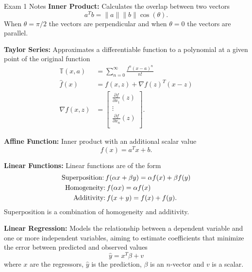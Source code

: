 \begin{examnotes}{Exam 1 Notes}
    \textbf{Inner Product:} Calculates the overlap between two vectors
    \begin{equation*}
        a^{T}b = \|a\|\|b\|\cos{(\theta)}.
    \end{equation*}
    When $\theta = \pi / 2$ the vectors are perpendicular and when $\theta = 0$ the vectors are parallel.

    \textbf{Taylor Series:} Approximates a differentiable function to a polynomial at a given point of the original function
    \begin{align*}
        \mathbb{T}(x,a) & = \sum_{n = 0}^{\infty} \frac{f^{n}(x-a)^{n}}{n!} \\
        \hat{f}(x) & = f(x,z) + \nabla f(z)^{T}(x-z) \\
        \nabla f(x,z) & = 
        \begin{bmatrix}
            \frac{\partial f}{\partial x_{1}}(z) \\
            \vdots \\
            \frac{\partial f}{\partial x_{n}}(z) \\
        \end{bmatrix}.
    \end{align*}

    \textbf{Affine Function:} Inner product with an additional scalar value
    \begin{equation*}
        f(x) = a^{T}x + b.
    \end{equation*}

    \textbf{Linear Functions:} Linear functions are of the form
    \begin{align*}
        \text{Superposition:} \hspace*{2pt} & f(\alpha x + \beta y) = \alpha f(x) + \beta f(y) \\
        \text{Homogeneity:} & \hspace*{2pt} f(\alpha x) = \alpha f(x) \\
        \text{Additivity:} & \hspace*{2pt} f(x + y) = f(x) + f(y).
    \end{align*}
    Superposition is a combination of homogeneity and additivity.

    \textbf{Linear Regression:} Models the relationship between a dependent variable and one or more independent variables, aiming to estimate coefficients that minimize the error between predicted
    and observed values
    \begin{equation*}
        \hat{y} = x^{T}\beta + v
    \end{equation*}
    where $x$ are the regressors, $\hat{y}$ is the prediction, $\beta$ is an $n$-vector and $v$ is a scalar.


\end{examnotes}
